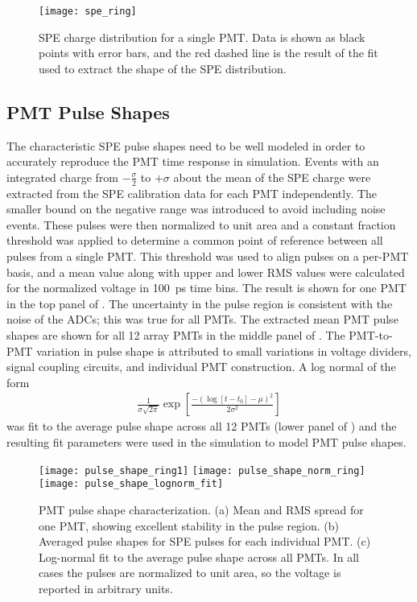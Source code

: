 \begin{figure}
	\centering
	\texttt{[image: spe\_ring]}
	\caption{SPE charge distribution for a single PMT. Data is shown as black points with error bars, and the red dashed line is the result of the fit used to extract the shape of the SPE distribution. }
	\label{fig:spe_data}
\end{figure}


\subsection{PMT Pulse Shapes}
\label{sec:pmtpulses}
The characteristic SPE pulse shapes need to be well modeled in order to accurately reproduce the PMT time response in simulation. 
Events with an integrated charge from $-\frac{\sigma}{2}$ to $+\sigma$ about the mean of the SPE charge were extracted from the SPE calibration data for each PMT independently. 
The smaller bound on the negative range was introduced to avoid including noise events. 
These pulses were then normalized to unit area and a constant fraction threshold was applied to determine a common point of reference between all pulses from a single PMT.  
This threshold was used to align pulses on a per-PMT basis, and a mean value along with upper and lower RMS values were calculated for the normalized voltage in 100~ps time bins.
The result is shown for one PMT in the top panel of . 
The uncertainty in the pulse region is consistent with the noise of the ADCs; this was true for all PMTs. 
The extracted mean PMT pulse shapes are shown for all 12 array PMTs in the middle panel of . 
The PMT-to-PMT variation in pulse shape is attributed to small variations in voltage dividers, signal coupling circuits, and individual PMT construction. 
A log normal of the form 
\begin{eqnarray}
\frac{1}{\sigma \sqrt{2\pi}}\exp{\left[\frac{-\left(\log[t-t_0]-\mu\right)^2}{2\sigma^2}\right]}
\end{eqnarray}
was fit to the average pulse shape across all 12 PMTs (lower panel of ) and the resulting fit parameters were used in the simulation to model PMT pulse shapes.
	
\begin{figure}
	\centering
	\texttt{[image: pulse\_shape\_ring1]}
	\texttt{[image: pulse\_shape\_norm\_ring]}
	\texttt{[image: pulse\_shape\_lognorm\_fit]}
	\caption{PMT pulse shape characterization.   (a) 
	Mean and RMS spread for one PMT, showing excellent stability in the pulse region.  (b) Averaged pulse shapes for SPE pulses for each individual PMT. 
	(c) Log-normal fit to the average pulse shape across all PMTs. 
	In all cases the pulses are normalized to unit area, so the voltage is reported in arbitrary units.}
	\label{fig:spe-pulse-shape}
\end{figure}



